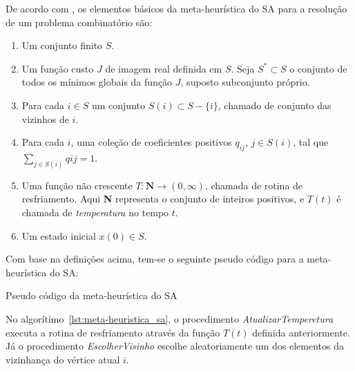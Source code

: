 De acordo com \cite{bertsimas1993simulated}, os elementos básicos da meta-heurística do SA
para a resolução de um problema combinatório são:

\begin{enumerate}
 \item Um conjunto finito $S$.
 \item Um função custo $J$ de imagem real definida em $S$. Seja $S^* \subset S$ o conjunto de todos os mínimos globais da
 função $J$, suposto subconjunto próprio.
 \item Para cada $i \in S$ um conjunto $S(i) \subset S - \{i\}$, chamado de conjunto das vizinhos de $i$.
 \item Para cada $i$, uma coleção de coeficientes positivos $q_{ij}$, $j \in S(i)$, tal que $\sum_{j \in S(i)} q{ij} = 1$.
 \item Uma função não crescente $T: \textbf{N} \rightarrow (0,\infty)$, chamada de rotina de resfriamento. Aqui \textbf{N}
 representa o conjunto de inteiros positivos, e $T(t)$ é chamada de \textit{temperatura} no tempo $t$.
 \item Um estado inicial $x(0) \in S$.
\end{enumerate}

Com base na definições acima, tem-se o seguinte pseudo código para a meta-heurística do SA:

\begin{algorithm}[H]


\caption{Pseudo código da meta-heurística do SA\label{lst:meta-heuristica_sa}}
\end{algorithm}

No algorítimo~\ref{lst:meta-heuristica_sa}, o procedimento \textit{AtualizarTemperetura} executa a
rotina de resfriamento através da função $T(t)$ definida anteriormente. Já o procedimento
\textit{EscolherVisinho} escolhe aleatoriamente um dos elementos da vizinhança do vértice atual $i$.
